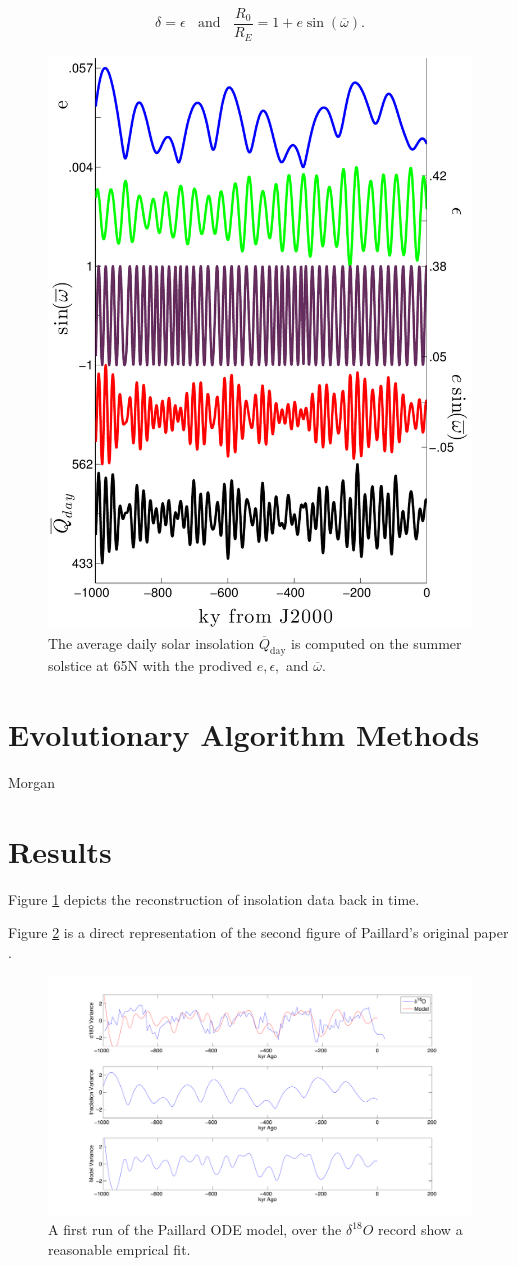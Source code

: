 $$ \delta = \epsilon ~~~~\text{and} ~~~~ \frac{R_0}{R_E} = 1 + e\sin (\overline {\omega}) .$$

\begin{figure}[tpb!]
\centering
  \includegraphics[width=.48\textwidth]{../data/insolation/laskar2004/insol_data2_noname.pdf}
  \caption{
    The average daily solar insolation $\overline{Q}_{\text{day}}$ is computed on the summer solstice at 65N with the prodived $e,\epsilon,$ and $\overline{\omega}$.
  }
  \label{fig:insol-data}
\end{figure}


\section{Evolutionary Algorithm Methods}



Morgan

\section{Results}

Figure \ref{fig:insol-data} depicts the reconstruction of insolation data back in time.


Figure \ref{fig:paillard-fig3} is a direct representation of the second figure of Paillard's original paper \cite{paillard1998timing}.

\begin{figure}[tpb!]
\centering
  \includegraphics[width=.53\textwidth]{paillardFig3.pdf}
  \caption{
    A first run of the Paillard ODE model, over the $\delta ^{18} O$ record show a reasonable emprical fit.
  }
  \label{fig:paillard-fig3}
\end{figure}




